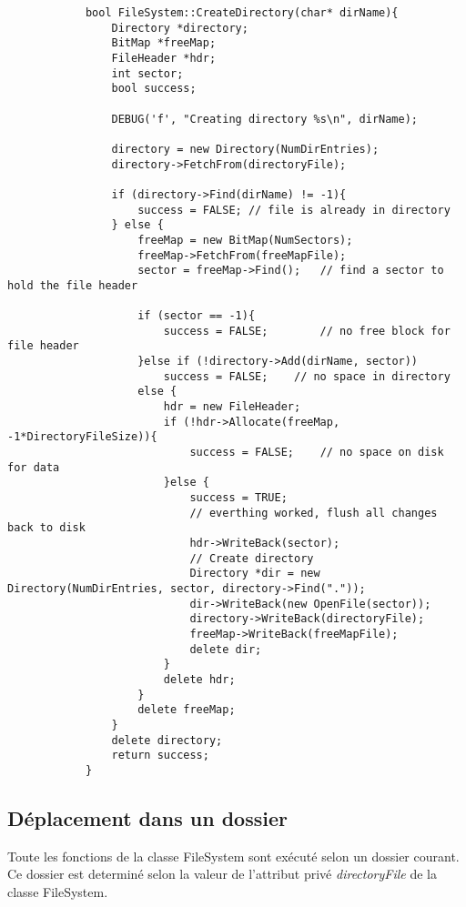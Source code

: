 \documentclass[a4paper,10pt]{article}
\begin{document}
        \begin{lstlisting}
            bool FileSystem::CreateDirectory(char* dirName){
                Directory *directory;
                BitMap *freeMap;
                FileHeader *hdr;
                int sector;
                bool success;

                DEBUG('f', "Creating directory %s\n", dirName);

                directory = new Directory(NumDirEntries);
                directory->FetchFrom(directoryFile);

                if (directory->Find(dirName) != -1){
                    success = FALSE; // file is already in directory
                } else {
                    freeMap = new BitMap(NumSectors);
                    freeMap->FetchFrom(freeMapFile);
                    sector = freeMap->Find();	// find a sector to hold the file header

                    if (sector == -1){
                        success = FALSE;		// no free block for file header
                    }else if (!directory->Add(dirName, sector))
                        success = FALSE;	// no space in directory
                    else {
                        hdr = new FileHeader;
                        if (!hdr->Allocate(freeMap, -1*DirectoryFileSize)){
                            success = FALSE;	// no space on disk for data
                        }else {
                            success = TRUE;
                            // everthing worked, flush all changes back to disk
                            hdr->WriteBack(sector);
                            // Create directory
                            Directory *dir = new Directory(NumDirEntries, sector, directory->Find("."));
                            dir->WriteBack(new OpenFile(sector));
                            directory->WriteBack(directoryFile);
                            freeMap->WriteBack(freeMapFile);
                            delete dir;
                        }
                        delete hdr;
                    }
                    delete freeMap;
                }
                delete directory;
                return success;
            }
        \end{lstlisting}

    \subsection{Déplacement dans un dossier}
        Toute les fonctions de la classe FileSystem sont exécuté selon un dossier courant. Ce
        dossier est determiné selon la valeur de l'attribut privé \textit{directoryFile} de la
        classe FileSystem.
\end{document}
